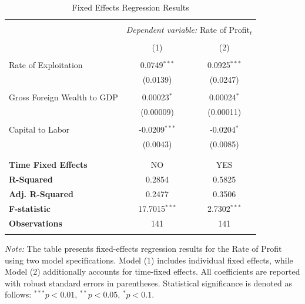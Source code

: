 \documentclass[10pt]{article}
\begin{document}
\begin{table}[!htbp]
\centering
\caption{Fixed Effects Regression Results}
\label{table:regression_results}
\begin{tabular}{@{\extracolsep{5pt}}lcc}
\\[-1.8ex] \hline
\hline \\[-1.8ex]
& \multicolumn{2}{c}{\textit{Dependent variable:} Rate of Profit$_{t}$} \\
\\[-1.8ex] & (1) & (2) \\
\hline \\[-1.8ex]
Rate of Exploitation  & 0.0749$^{***}$  & 0.0925$^{***}$  \\
                         & (0.0139)        & (0.0247)        \\
\\[-1.8ex]
Gross Foreign Wealth to GDP & 0.00023$^{*}$  & 0.00024$^{*}$  \\
                         & (0.00009)       & (0.00011)       \\
\\[-1.8ex]
Capital to Labor   & -0.0209$^{***}$ & -0.0204$^{*}$  \\
                         & (0.0043)        & (0.0085)        \\
\\[-1.8ex]
\hline \\[-1.8ex]
\textbf{Time Fixed Effects} & NO  &  YES \\
\textbf{R-Squared} & 0.2854           & 0.5825          \\
\textbf{Adj. R-Squared} & 0.2477      & 0.3506          \\
\textbf{F-statistic} & 17.7015$^{***}$ & 2.7302$^{***}$ \\
\textbf{Observations} & 141 & 141 \\
\hline
\hline \\[-1.8ex]
\end{tabular}

\begin{minipage}[t]{\textwidth}
\small
\textit{Note:} The table presents fixed-effects regression results for the Rate of Profit using two model specifications. Model (1) includes individual fixed effects, while Model (2) additionally accounts for time-fixed effects. All coefficients are reported with robust standard errors in parentheses. Statistical significance is denoted as follows: $^{***} p<0.01$, $^{**} p<0.05$, $^{*} p<0.1$.
\end{minipage}
\end{table}
\end{document}
